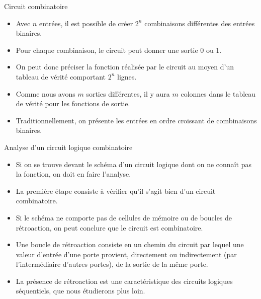 \documentclass[presentation]{beamer}
\begin{document}
\begin{frame}[label={sec:orgdc306ec}]{Circuit combinatoire}
\begin{itemize}
\item Avec \(n\) entrées, il est possible de créer \(2^n\) combinaisons différentes des entrées binaires.

\item Pour chaque combinaison, le circuit peut donner une sortie 0 ou 1.

\item On peut donc préciser la fonction réalisée par le circuit au moyen d'un tableau de vérité comportant \(2^n\) lignes.

\item Comme nous avons \(m\) sorties différentes, il y aura \(m\) colonnes dans le tableau de vérité pour les fonctions de sortie.

\item Traditionnellement, on présente les entrées en ordre croissant de combinaisons binaires.
\end{itemize}
\end{frame}

\begin{frame}[label={sec:org0611411}]{Analyse d'un circuit logique combinatoire}
\begin{itemize}
\item Si on se trouve devant le schéma d'un circuit logique dont on ne connaît pas la fonction, on doit en faire l'analyse.

\item La première étape consiste à vérifier qu'il s'agit bien d'un circuit combinatoire.

\item Si le schéma ne comporte pas de cellules de mémoire ou de boucles de rétroaction, on peut conclure que le circuit est combinatoire.

\item Une boucle de rétroaction consiste en un chemin du circuit par lequel une valeur d'entrée d'une porte provient, directement ou indirectement (par l'intermédiaire d'autres portes), de la sortie de la même porte.

\item La présence de rétroaction est une caractéristique des circuits logiques séquentiels, que nous étudierons plus loin.
\end{itemize}
\end{frame}
\end{document}
